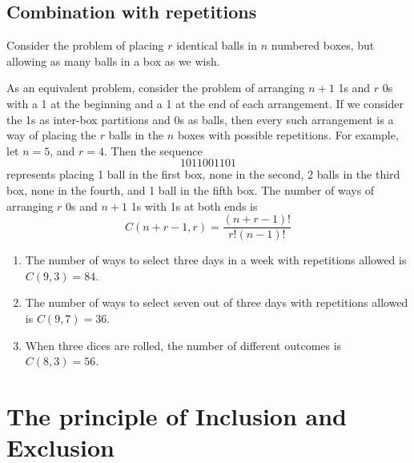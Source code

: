 \subsection{Combination with repetitions}

Consider the problem of placing $r$ identical balls in $n$ numbered boxes, but allowing as many balls in a box as we wish. 

As an equivalent problem, consider the problem of arranging $n+1$ 1s and $r$ 0s with a 1 at the beginning and a 1 at the end of each arrangement. If we consider the 1s as inter-box partitions and 0s as balls, then every such arrangement is
a way of placing the $r$ balls in the $n$ boxes with possible repetitions. For example, let $ n= 5$, and $r = 4$. Then the sequence
\[
1011001101
\]
represents placing 1 ball in the first box, none in the second, 2 balls in the third box, none in the fourth, and 1 ball in the fifth box. The number of ways of arranging $r$ 0s and $n+1$ 1s with 1s at both ends is
\[
C(n+r-1,r) = \frac{(n+r-1)!}{r!(n-1)!}
\]

\begin{example}
\begin{enumerate}
\item The number of ways to select three days in a week with repetitions allowed is $C(9,3) = 84$.
\item The number of ways to select seven out of three days with repetitions allowed is $C(9,7) = 36$.
\item When three dices are rolled, the number of different outcomes is $C(8,3) = 56$.
\end{enumerate}
\end{example}
\section{The principle of Inclusion and Exclusion}

